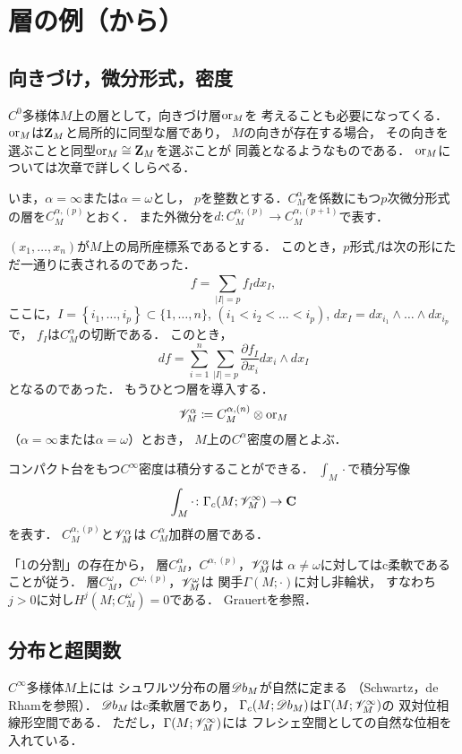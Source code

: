 \section*{層の例（{\cite[\S2.9]{KS90}}から）}

\subsection{向きづけ，微分形式，密度}
\(C^0\)多様体\(M\)上の層として，向きづけ層\(\mathord{\mathrm{or}} _M\)を
考えることも必要になってくる．
\(\mathord{\mathrm{or}}_M\)は\(\mathbf{Z}_M\)と局所的に同型な層であり，
\(M\)の向きが存在する場合，
その向きを選ぶことと同型\(\mathord{\mathrm{or}}_M\cong\mathbf{Z}_M\)を選ぶことが
同義となるようなものである．
\(\mathord{\mathrm{or}}_M\)については次章で詳しくしらべる．

いま，\(\alpha=\infty\)または\(\alpha=\omega\)とし，
\(p\)を整数とする．\(C^\alpha_M\)を係数にもつ\(p\)次微分形式
の層を\(C_M^{\alpha,(p)}\)とおく．
また外微分を\(
    d\colon C_M^{\alpha,(p)}\to C_M^{\alpha,(p+1)}
\)で表す．

\((x_1,\dots,x_n)\)が\(M\)上の局所座標系であるとする．
このとき，\(p\)形式\(f\)は次の形にただ一通りに表されるのであった．
\[
    f=\sum_{\lvert I\rvert=p}^{}f_Idx_I,
\]ここに，\(
    I=\left\{i_1,\dots,i_p\right\}\subset\{1,\dots,n\}
\), \((i_1<i_2<\dots<i_p)\), 
\(dx_I=dx_{i_1}\wedge\dots\wedge dx_{i_p}\)で，
\(f_I\)は\(C^\alpha_M\)の切断である．
このとき，\[
    df=\sum_{i=1}^{n}\sum_{\lvert I\rvert=p}^{}\frac{\partial f_I}{\partial x_i}dx_i\wedge dx_I
\]となるのであった．
もうひとつ層を導入する．
\[
    \mathscr{V}_M^\alpha
    \coloneqq
    C^{\alpha,(n)}_M\otimes\mathord{\mathrm{or}}_M
\]（\(\alpha=\infty\)または\(\alpha=\omega\)）とおき，
\(M\)上の\(C^\alpha\)密度の層とよぶ．

コンパクト台をもつ\(C^\infty\)密度は積分することができる．
\(\int_M\cdot\)で積分写像
\begin{equation}
    \int_M\cdot\colon\Gamma_c(M;\mathscr{V}_M^\infty)\to\mathbf{C} \label{eq:int}
\end{equation}を表す．
\(C^{\alpha,(p)}_M\)と\(\mathscr{V}_M^\alpha\)は
\(C^\alpha_M\)加群の層である．

「1の分割」の存在から，
層\(C^\alpha_M\)，\(C^{\alpha,(p)}\)，\(\mathscr{V}_M^\alpha\)は
\(\alpha\neq\omega\)に対してはc柔軟であることが従う．
層\(C^\omega_M\)，\(C^{\omega,(p)}\)，\(\mathscr{V}_M^\omega\)は
関手\(\Gamma(M;\cdot)\)に対し非輪状，
すなわち\(j>0\)に対し\(H^j(M;C^\omega_M)=0\)である．
Grauert\cite{G58}を参照．

\subsection{分布と超関数}
\(C^\infty\)多様体\(M\)上には
シュワルツ分布の層\(\mathord{\mathscr{D}b}_M\)が自然に定まる
（Schwartz\cite{S66}，de Rham\cite{R55}を参照）．
\(\mathord{\mathscr{D}b}_M\)はc柔軟層であり，
\(\Gamma_c(M;\mathord{\mathscr{D}b}_M)\)は\(\Gamma(M;\mathscr{V}_M^\infty)\)の
双対位相線形空間である．
ただし，\(\Gamma(M;\mathscr{V}_M^\infty)\)には
フレシェ空間としての自然な位相を入れている．

